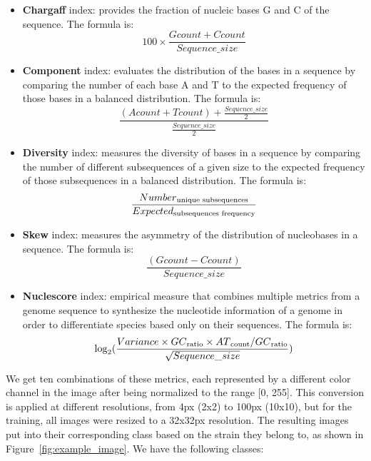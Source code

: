 \begin{itemize}
	\item \textbf{Chargaff} index: provides the fraction of nucleic bases G and C of the sequence. The formula is:
	      \begin{equation}
		      100 \times \frac{Gcount + Ccount}{Sequence\_size}
	      \end{equation}
	\item \textbf{Component} index: evaluates the distribution of the bases in a sequence by comparing the number of each base A and
	      T to the expected frequency of those bases in a balanced distribution. The formula is:
	      \begin{equation}
		      \frac{(Acount + Tcount) + \frac{Sequence\_size}{2}}{\frac{Sequence\_size}{2}}
	      \end{equation}
	\item \textbf{Diversity} index: measures the diversity of bases in a sequence by comparing the number of different subsequences of a
	      given size to the expected frequency of those subsequences in a balanced distribution. The formula is:
	      \begin{equation}
		      \frac{Number\textsubscript{unique subsequences}}{Expected\textsubscript{subsequences frequency}}
	      \end{equation}
	\item \textbf{Skew} index: measures the asymmetry of the distribution of nucleobases in a sequence. The formula is:
	      \begin{equation}
		      \frac{(Gcount - Ccount)}{Sequence\_size}
	      \end{equation}
	\item \textbf{Nuclescore} index: empirical measure that combines multiple metrics from a genome sequence to synthesize the nucleotide
	      information of a genome in order to differentiate species based only on their sequences. The formula is:
	      \begin{equation}
		      \log_{2}(\frac{Variance \times GC\textsubscript{ratio} \times AT\textsubscript{count}/GC\textsubscript{ratio}}{\sqrt{Sequence\_size}})
	      \end{equation}
\end{itemize}

We get ten combinations of these metrics, each represented by a different color channel in the image after being normalized to the range [0, 255].
This conversion is applied at different resolutions, from 4px (2x2) to 100px (10x10), but for the training, all images were resized to a 32x32px resolution.
The resulting images put into their corresponding class based on the strain they belong to, as shown in Figure~\ref{fig:example_image}. We have the following
classes:

